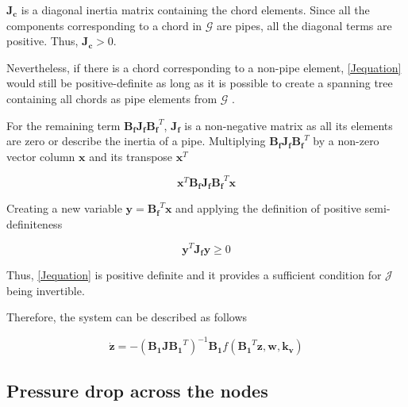 $\bm{J_c}$ is a diagonal inertia matrix containing the chord elements. Since all the components corresponding to a chord in $\bm{\mathcal{G}}$ are pipes, all the 
diagonal terms are positive. Thus, $\bm{J_c} > 0$. 

Nevertheless, if there is a chord corresponding to a non-pipe element, \eqref{Jequation} 
would still be positive-definite as long as it is possible to create a spanning tree containing all chords as pipe elements from $\bm{\mathcal{G}}$ \cite{TowerModel}.

For the remaining term $\bm{B_f J_f {B_f}}^T$, $\bm{J_f}$ is a non-negative matrix as all its elements are zero or describe the inertia of a pipe. 
Multiplying $\bm{B_f J_f {B_f}}^T$ by a non-zero vector column $\mathbf{x}$ and its transpose $\mathbf{x}^{T}$

\begin{equation}
  \bm{x}^{T} \bm{B_f J_f {B_f}}^T \bm{x}
  \label{PosDefi}
\end{equation}

Creating a new variable $\bm{y} = \bm{B_f}^T \mathbf{x}$ and applying the definition of positive semi-definiteness 
\cite{MatrixBook}

\begin{equation}
  \bm{y}^{T} \bm{J_f y} \geqslant 0
  \label{PosDefEq}
\end{equation}

Thus, \eqref{Jequation} is positive definite and it provides a sufficient condition for $\bm{\mathcal{J}}$ being invertible. 

Therefore, the system can be described as follows

\begin{equation}
   \bm{\dot{z}}  = - (\bm{B_1 J {B_1}}^T)^{-1}\bm{B_1} f({\bm{B_1}}^T \bm{z},\bm{ w}, \bm{k_v})
   \label{ParatModelFinal}
 \end{equation}

\subsection{Pressure drop across the nodes}
\label{ModelRelationSection}



